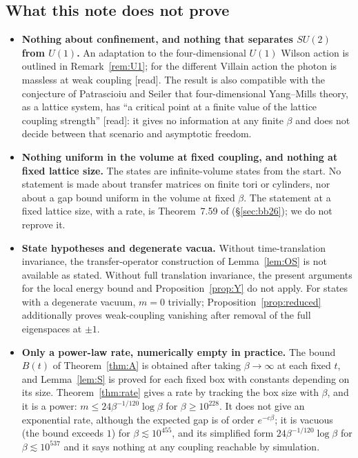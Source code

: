 \documentclass[11pt,a4paper]{article}
\theoremstyle{plain}
\theoremstyle{definition}
\theoremstyle{remark}
\numberwithin{equation}{section}
\newcommand{\st}[1]{\textsf{[#1]}}
\begin{document}
\subsection{What this note does not prove}\label{sec:notprove}
\begin{itemize}
\item \textbf{Nothing about confinement, and nothing that separates $SU(2)$ from $U(1)$.} An adaptation to the four-dimensional $U(1)$
Wilson action is outlined in Remark~\ref{rem:U1}; for the different Villain action the photon is massless at weak coupling
\cite[\S2.11]{FS82} \st{read}. The result is also compatible with the conjecture of Patrascioiu and Seiler that four-dimensional Yang--Mills
theory, as a lattice system, has ``a critical point at a finite value of the lattice coupling strength'' \cite[\S1, p.~2]{Sei03}
\st{read}: it gives no information at any finite $\beta$ and does not decide between that scenario and asymptotic freedom.
\item \textbf{Nothing uniform in the volume at fixed coupling, and nothing at fixed lattice size.} The states are infinite-volume states from the start. No statement is made
about transfer matrices on finite tori or cylinders, nor about a gap bound uniform in the volume at fixed $\beta$. The statement at a fixed lattice size, with a rate, is Theorem~7.59 of \cite{BB26} (\S\ref{sec:bb26}); we do not reprove it.
\item \textbf{State hypotheses and degenerate vacua.} Without time-translation invariance, the transfer-operator construction of
Lemma~\ref{lem:OS} is not available as stated. Without full translation invariance, the present arguments for the local energy bound
and Proposition~\ref{prop:Y} do not apply. For states with a degenerate vacuum, $m=0$ trivially;
Proposition~\ref{prop:reduced} additionally proves weak-coupling vanishing after removal of the full eigenspaces at $\pm1$.
\item \textbf{Only a power-law rate, numerically empty in practice.}
The bound $B(t)$ of Theorem~\ref{thm:A} is obtained after taking $\beta\to\infty$ at each fixed $t$, and Lemma~\ref{lem:S} is proved for each fixed box with constants depending on its size.
Theorem~\ref{thm:rate} gives a rate by tracking the box size with $\beta$, and it is a power: $m\le24\beta^{-1/120}\log\beta$ for $\beta\ge10^{228}$. It does not give an exponential rate, although the expected
gap is of order $e^{-c\beta}$; it is vacuous (the bound exceeds $1$) for $\beta\lesssim10^{455}$, and its simplified form $24\beta^{-1/120}\log\beta$ for $\beta\lesssim10^{537}$ and it says nothing at any coupling reachable by simulation.

\end{itemize}
\end{document}
